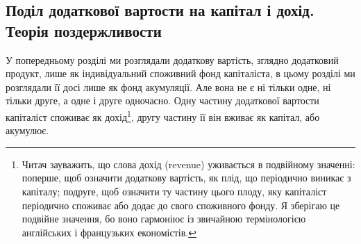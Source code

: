 
\subsection{Поділ додаткової вартости на капітал і дохід.
Теорія поздержливости}

У попередньому розділі ми розглядали додаткову вартість,
зглядно додатковий продукт, лише як індивідуальний споживний
фонд капіталіста, в цьому розділі ми розглядали її досі лише як
фонд акумуляції. Але вона не є ні тільки одне, ні тільки друге,
а одне і друге одночасно. Одну частину додаткової вартости капіталіст
споживає як дохід\footnote{
Читач зауважить, що слова дохід (revenue) уживається в подвійному
значенні: поперше, щоб означити додаткову вартість, як плід, що
періодично виникає з капіталу; подруге, щоб означити ту частину цього
плоду, яку капіталіст періодично споживає або додає до свого споживного
фонду. Я зберігаю це подвійне значення, бо воно гармоніює із звичайною
термінологією англійських і французьких економістів.
}, другу частину її він вживає як капітал,
або акумулює.


